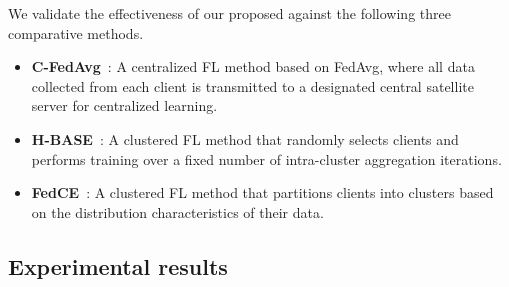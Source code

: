 We validate the effectiveness of our proposed \algname against the following three comparative methods.
\begin{itemize}

    
    
    \item\textbf{C-FedAvg}~\cite{ChenPIMRC23}: A centralized FL method based on FedAvg, where all data collected from each client is transmitted to a designated central satellite server for centralized learning.
    

    \item\textbf{H-BASE}~\cite{LiuICC20}: A clustered FL method that randomly selects clients and performs training over a fixed number of intra-cluster aggregation iterations.
    
    \item\textbf{FedCE}~\cite{FedCE23}: A clustered FL method that partitions clients into clusters based on the distribution characteristics of their data.
    

\end{itemize}




\subsection{Experimental results}




